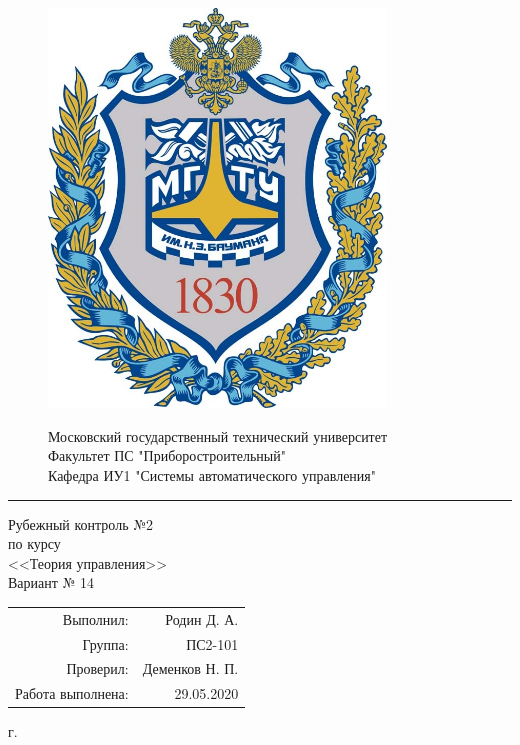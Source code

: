 \begin{center}
	\begin{figure}[h]
		\begin{minipage}[h]{0.2\textwidth}
			\includegraphics[width=0.8\textwidth]{bmstu.png}
		\end{minipage}
		\begin{minipage}[h]{0.9\textwidth}
			\large \center Московский государственный технический университет\\
			Факультет ПС "Приборостроительный"\\
			Кафедра ИУ1 "Системы автоматического управления"
		\end{minipage}
		
	\end{figure}
	\rule{18cm}{0.8pt}
	Рубежный контроль №2\\
	\vspace{2pt}
	по курсу\\
	\vspace{2pt}
	<<Теория управления>>\\
	\vspace{0.8pt}
	Вариант № 14
	\vspace{7cm}
	\flushright \begin{tabular}{rr}
		Выполнил: & Родин Д. А. \\
		Группа: & ПС2-101 \\
		Проверил: & Деменков Н. П.\\
		Работа выполнена: &  29.05.2020\\
	\end{tabular}
	
	\vfill
	 г.
\end{center}
\clearpage